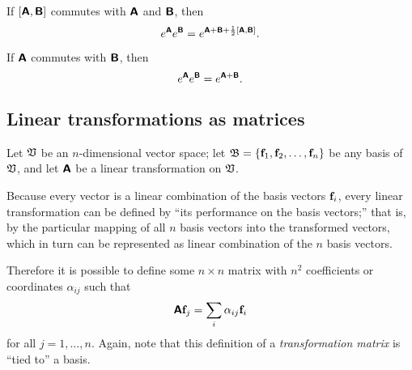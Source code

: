 If $[\textsf{\textbf{A}},\textsf{\textbf{B}}]$ commutes with $\textsf{\textbf{A}}$ and
$\textsf{\textbf{B}}$, then
 \begin{equation}
 e^\textsf{\textbf{A}}e^\textsf{\textbf{B}}=
e^{\textsf{\textbf{A}}+\textsf{\textbf{B}}+{1\over 2}\left[\textsf{\textbf{A}},\textsf{\textbf{B}}\right]}.
 \end{equation}

If  $\textsf{\textbf{A}}$ commutes with $\textsf{\textbf{B}}$, then
 \begin{equation}
 e^\textsf{\textbf{A}}e^\textsf{\textbf{B}}=
e^{\textsf{\textbf{A}}+\textsf{\textbf{B}}}.
 \end{equation}

\subsection{Linear transformations as matrices}



Let ${\frak V}$ be an $n$-dimensional vector space;
let
${\frak B}=\{{\bf f}_1,{\bf f}_2,\ldots ,{\bf f}_n\}$ be any basis of ${\frak V}$,
and let  $\textsf{\textbf{A}}$ be a linear transformation on ${\frak V}$.

Because every vector is a linear combination of the basis vectors
${\bf f}_i$,
every linear transformation can be defined by
``its performance on the basis vectors;'' that is,
by the particular mapping of
all $n$ basis vectors into the transformed vectors, which in turn can be represented as linear combination of the $n$ basis vectors.

Therefore it is possible to define some $n \times n$ matrix with $n^2$ coefficients or coordinates
$\alpha_{ij}$ such that
\begin{equation}
\textsf{\textbf{A}} {\bf f}_j = \sum_i \alpha_{ij}{\bf f}_i
\end{equation}
for all $j=1,\ldots ,n$.
Again, note that this definition of a {\em transformation matrix}
is ``tied to'' a basis.

